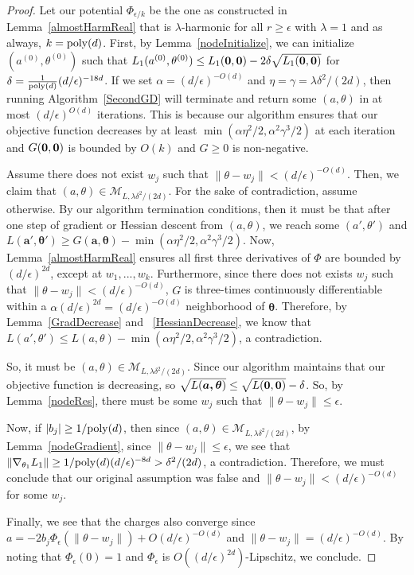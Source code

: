 \begin{proof}
Let our potential $\Phi_{\epsilon/k}$ be the one as constructed in Lemma~\ref{almostHarmReal} that is $\lambda$-harmonic for all $r \geq \epsilon$ with $\lambda = 1$ and as always, $k = \mathrm{poly}(d)$. First, by Lemma~\ref{nodeInitialize},  we can initialize ${(a^{(0)},\theta^{(0)})}$ such that $L_1({a^{(0)},\theta^{(0)}}) \leq  L_1({\bf 0,0}) - 2\delta \sqrt{L_1({\bf 0,0})}$ for $ \delta = \frac{1}{\mathrm{poly}(d)}(d/\epsilon)^{ -18d}$. If we set $\alpha = (d/\epsilon)^{-O(d)}$ and $\eta = \gamma = \lambda \delta^2/(2d)$,  then running Algorithm~\ref{SecondGD} will terminate and return some $(a,\theta)$ in at most $(d/\epsilon)^{O(d)}$ iterations. This is because our algorithm ensures that our objective function decreases by at least $\min(\alpha \eta^2/2, \alpha^2\gamma^3/2)$ at each iteration and $G({\bf 0, 0})$ is bounded by $O(k)$ and $G \geq 0$ is non-negative.

Assume there does not exist $w_j$ such that $\|\theta - w_j\| < (d/\epsilon)^{-O(d)}$. Then, we claim that $(a,\theta) \in \mathcal{M}_{L,\lambda \delta^2/(2d)}$. For the sake of contradiction, assume otherwise. By our algorithm termination conditions, then it must be that after one step of gradient or Hessian descent from $(a,\theta)$, we reach some $(a',\theta')$ and $L(\boldsymbol{a',\theta'}) \geq G(\boldsymbol{a,\theta}) - \min(\alpha\eta^2/2,\alpha^2\gamma^3/2)$. Now, Lemma~\ref{almostHarmReal} ensures all first three derivatives of $\Phi$ are bounded by $(d/\epsilon)^{2d}$, except at $w_1,...,w_k$. Furthermore, since there does not exists $w_j$ such that $\|\theta - w_j\| < (d/\epsilon)^{-O(d)}$, $G$ is three-times continuously differentiable within a $\alpha (d/\epsilon)^{2d} = (d/\epsilon)^{-O(d)}$ neighborhood of $\boldsymbol{\theta}$. Therefore, by Lemma~\ref{GradDecrease} and ~\ref{HessianDecrease}, we know that $L(a',\theta') \leq L(a,\theta) - \min(\alpha\eta^2/2,\alpha^2\gamma^3/2)$, a contradiction. 

So, it must be $(a,\theta) \in \mathcal{M}_{L,\lambda \delta^2/(2d)}$. Since our algorithm maintains that our objective function is decreasing, so $\sqrt{L(\boldsymbol{a,\theta})} \leq \sqrt{L({\bf 0,0})} - \delta $. So, by Lemma~\ref{nodeRes}, there must be some $w_j$ such that $\|\theta- w_j\|\leq \epsilon$.

Now, if $|b_j| \geq 1/\mathrm{poly}(d)$, then since $(a,\theta) \in \mathcal{M}_{L,\lambda \delta^2/(2d)}$, by Lemma~\ref{nodeGradient}, since $\|\theta - w_j \| \leq \epsilon$, we see that $\|\nabla_{\theta_1}L_1 \| \geq 1/\mathrm{poly}(d)(d/\epsilon)^{-8d} > \delta^2/(2d)$, a contradiction. Therefore, we must conclude that our original assumption was false and $\|\theta - w_j\| < (d/\epsilon)^{-O(d)}$ for some $w_j$.

Finally, we see that the charges also converge since $a = -2b_j \Phi_\epsilon(\|\theta - w_j\|) + O(d/\epsilon)^{-O(d)}$ and $\|\theta - w_j\| = (d/\epsilon)^{-O(d)}$. By noting that $\Phi_\epsilon(0) = 1$ and $\Phi_\epsilon$ is $O((d/\epsilon)^{2d})$-Lipschitz, we conclude. 
\end{proof}

